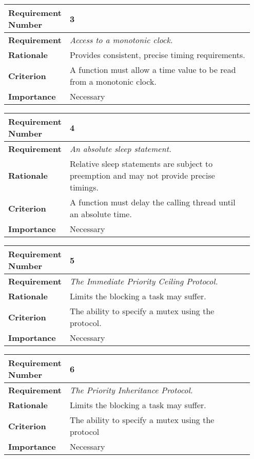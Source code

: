 \begin{table}[!h]
\centering
\begin{tabular}{|L{0.2\linewidth}|L{0.75\linewidth}|}
\hline
\textbf{Requirement Number} & 3 \\ \hline
\textbf{Requirement} & \emph{Access to a monotonic clock.} \\ \hline
\textbf{Rationale}      & Provides consistent, precise timing requirements. \\ \hline
\textbf{Criterion}      & A function must allow a time value to be read from a monotonic
                clock. \\ \hline
\textbf{Importance}     & Necessary \\ \hline
\end{tabular}
\end{table}
\begin{table}[!h]
\centering
\begin{tabular}{|L{0.2\linewidth}|L{0.75\linewidth}|}
\hline
\textbf{Requirement Number} & 4 \\ \hline
\textbf{Requirement} & \emph{An absolute sleep statement.} \\ \hline
\textbf{Rationale}      & Relative sleep statements are subject to preemption and may not 
                provide precise timings. \\ \hline
\textbf{Criterion}      & A function must delay the calling thread until an absolute time. \\ \hline
\textbf{Importance}     & Necessary \\ \hline
\end{tabular}
\end{table}
\begin{table}[!h]
\centering
\begin{tabular}{|L{0.2\linewidth}|L{0.75\linewidth}|}
\hline
\textbf{Requirement Number} & 5 \\ \hline
\textbf{Requirement} & \emph{The Immediate Priority Ceiling
Protocol.} \\ \hline
\textbf{Rationale}      & Limits the blocking a task may suffer.  \\ \hline
\textbf{Criterion}      & The ability to specify a mutex using the protocol.\\ \hline
\textbf{Importance}     & Necessary \\ \hline
\end{tabular}
\end{table}
\begin{table}[!h]
\centering
\begin{tabular}{|L{0.2\linewidth}|L{0.75\linewidth}|}
\hline
\textbf{Requirement Number} & 6 \\ \hline
\textbf{Requirement} & \emph{The Priority Inheritance Protocol.}\\ \hline
\textbf{Rationale}      & Limits the blocking a task may suffer. \\ \hline
\textbf{Criterion}      & The ability to specify a mutex using the protocol\\ \hline
\textbf{Importance}     & Necessary \\ \hline
\end{tabular}
\end{table}
